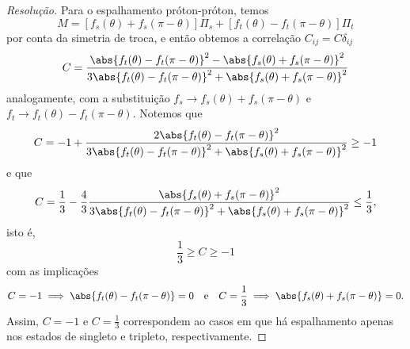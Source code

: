 \begin{proof}[Resolução]
   Para o espalhamento próton-próton, temos
   \begin{equation*}
      M = \left[f_s(\theta) + f_s(\pi - \theta)\right] \Pi_s + \left[f_t(\theta) - f_t(\pi - \theta)\right]\Pi_t
   \end{equation*}
   por conta da simetria de troca, e então obtemos a correlação \(C_{ij} = C \delta_{ij}\)
   \begin{equation*}
      C = \frac{\abs{f_t(\theta) - f_t(\pi - \theta)}^2 - \abs{f_s(\theta) + f_s(\pi - \theta)}^2}{3\abs{f_t(\theta) - f_t(\pi - \theta)}^2 + \abs{f_s(\theta) + f_s(\pi - \theta)}^2}
   \end{equation*}
   analogamente, com a substituição \(f_s \to f_s(\theta) + f_s(\pi - \theta)\) e \(f_t \to f_t(\theta) - f_t(\pi - \theta)\). Notemos que
   \begin{equation*}
       C = -1 + \frac{2\abs{f_t(\theta) - f_t(\pi - \theta)}^2}{3\abs{f_t(\theta) - f_t(\pi - \theta)}^2 + \abs{f_s(\theta) + f_s(\pi - \theta)}^2} \geq -1
   \end{equation*}
   e que
   \begin{equation*}
       C = \frac13 - \frac43\frac{\abs{f_s(\theta) + f_s(\pi - \theta)}^2}{3\abs{f_t(\theta) - f_t(\pi - \theta)}^2 + \abs{f_s(\theta) + f_s(\pi - \theta)}^2} \leq \frac13,
   \end{equation*}
   isto é, 
   \begin{equation*}
      \frac13 \geq C \geq -1
   \end{equation*}
   com as implicações 
   \begin{equation*}
      C = -1 \implies \abs{f_t(\theta) - f_t(\pi-\theta)} = 0
      \quad\text{e}\quad
      C = \frac13 \implies \abs{f_s(\theta) + f_s(\pi-\theta)} = 0.
   \end{equation*}
   Assim, \(C = -1\) e \(C = \frac13\) correspondem ao casos em que há espalhamento apenas nos estados de singleto e tripleto, respectivamente. \todo[Explicação.]
\end{proof}
